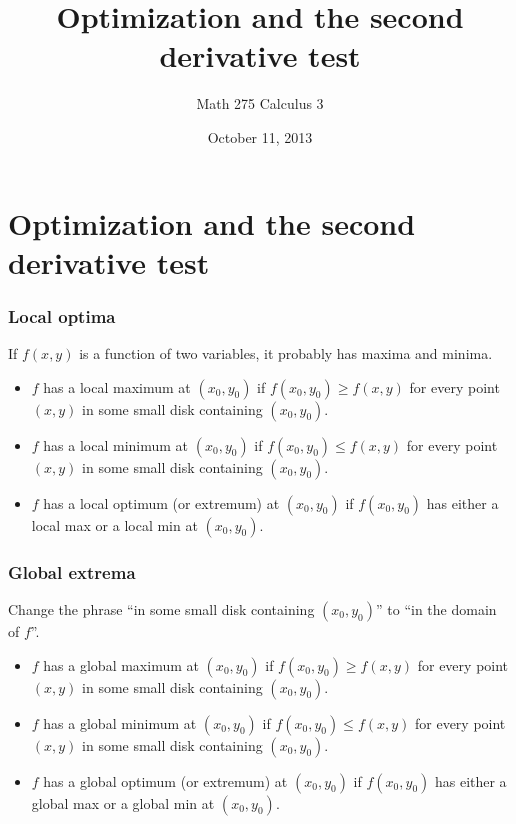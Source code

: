 \documentclass[11pt,ignorenonframetext,aspectratio=169,xcolor={svgnames}]{beamer}
\title{Optimization and the second derivative test}
\author{Math 275 Calculus 3}
\date{October 11, 2013}
\begin{document}
\frame{\titlepage}

\section{Optimization and the second derivative test}

\begin{frame}\frametitle{Local optima}

If $f(x,y)$ is a function of two variables, it probably has maxima and
minima.

\begin{itemize}
\item
  $f$ has a local maximum at $(x_0,y_0)$ if $f(x_0,y_0) \geq f(x,y)$ for
  every point $(x,y)$ in some small disk containing $(x_0,y_0)$.
\item
  $f$ has a local minimum at $(x_0,y_0)$ if $f(x_0,y_0) \leq f(x,y)$ for
  every point $(x,y)$ in some small disk containing $(x_0,y_0)$.
\item
  $f$ has a local optimum (or extremum) at $(x_0,y_0)$ if $f(x_0,y_0)$
  has either a local max or a local min at $(x_0, y_0)$.
\end{itemize}

\end{frame}

\begin{frame}\frametitle{Global extrema}

Change the phrase ``in some small disk containing $(x_0, y_0)$'' to ``in
the domain of $f$''.

\begin{itemize}

\item
  $f$ has a global maximum at $(x_0,y_0)$ if $f(x_0,y_0) \geq f(x,y)$
  for every point $(x,y)$ in some small disk containing $(x_0,y_0)$.
\item
  $f$ has a global minimum at $(x_0,y_0)$ if $f(x_0,y_0) \leq f(x,y)$
  for every point $(x,y)$ in some small disk containing $(x_0,y_0)$.
\item
  $f$ has a global optimum (or extremum) at $(x_0,y_0)$ if $f(x_0,y_0)$
  has either a global max or a global min at $(x_0, y_0)$.
\end{itemize}

\end{frame}
\end{document}
